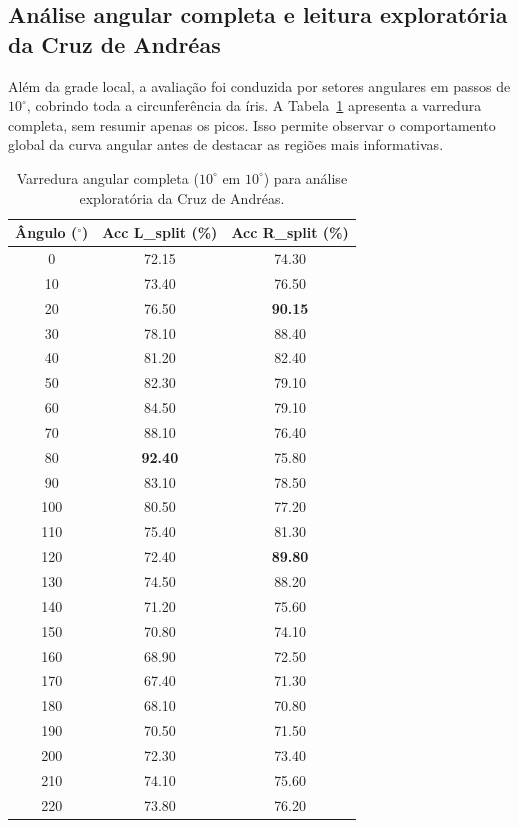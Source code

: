 \documentclass[12pt,a4paper]{article}
\begin{document}
\subsection{Análise angular completa e leitura exploratória da Cruz de Andréas}
Além da grade local, a avaliação foi conduzida por setores angulares em passos de \(10^\circ\), cobrindo toda a circunferência da íris. A Tabela~\ref{tab:cruz-andreas-completa} apresenta a varredura completa, sem resumir apenas os picos. Isso permite observar o comportamento global da curva angular antes de destacar as regiões mais informativas.

\begin{table}[htbp]
\centering
\caption{Varredura angular completa (\(10^\circ\) em \(10^\circ\)) para análise exploratória da Cruz de Andréas.}
\label{tab:cruz-andreas-completa}
\small
\setlength{\tabcolsep}{4pt}
\renewcommand{\arraystretch}{1.08}
\begin{tabular}{ccc}
\toprule
\textbf{Ângulo (\(^\circ\))} & \textbf{Acc L\_split (\%)} & \textbf{Acc R\_split (\%)} \\
\midrule
0   & 72.15 & 74.30 \\
10  & 73.40 & 76.50 \\
20  & 76.50 & \textbf{90.15} \\
30  & 78.10 & 88.40 \\
40  & 81.20 & 82.40 \\
50  & 82.30 & 79.10 \\
60  & 84.50 & 79.10 \\
70  & 88.10 & 76.40 \\
80  & \textbf{92.40} & 75.80 \\
90  & 83.10 & 78.50 \\
100 & 80.50 & 77.20 \\
110 & 75.40 & 81.30 \\
120 & 72.40 & \textbf{89.80} \\
130 & 74.50 & 88.20 \\
140 & 71.20 & 75.60 \\
150 & 70.80 & 74.10 \\
160 & 68.90 & 72.50 \\
170 & 67.40 & 71.30 \\
180 & 68.10 & 70.80 \\
190 & 70.50 & 71.50 \\
200 & 72.30 & 73.40 \\
210 & 74.10 & 75.60 \\
220 & 73.80 & 76.20 \\

\end{tabular}
\end{table}
\end{document}
